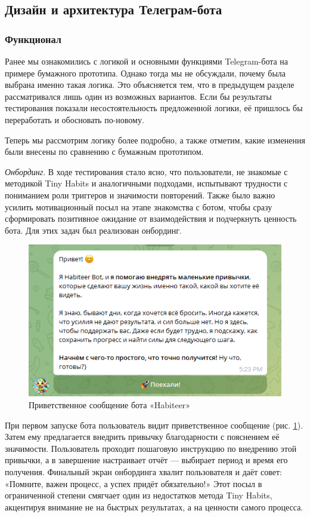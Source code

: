 \documentclass[pdflatex,sn-mathphys-num]{sn-jnl}%
\theoremstyle{thmstyleone}%
\theoremstyle{thmstyletwo}%
\theoremstyle{thmstylethree}%
\begin{document}
\subsection{Дизайн и архитектура Телеграм-бота}

\subsubsection{Функционал}

Ранее мы ознакомились с логикой и основными функциями Telegram-бота на примере бумажного прототипа. Однако тогда мы не обсуждали, почему была выбрана именно такая логика. Это объясняется тем, что в предыдущем разделе рассматривался лишь один из возможных вариантов. Если бы результаты тестирования показали несостоятельность предложенной логики, её пришлось бы переработать и обосновать по-новому.

Теперь мы рассмотрим логику более подробно, а также отметим, какие изменения были внесены по сравнению с бумажным прототипом.

\textit{Онбординг}. В ходе тестирования стало ясно, что пользователи, не знакомые с методикой Tiny Habits и аналогичными подходами, испытывают трудности с пониманием роли триггеров и значимости повторений. Также было важно усилить мотивационный посыл на этапе знакомства с ботом, чтобы сразу сформировать позитивное ожидание от взаимодействия и подчеркнуть ценность бота. Для этих задач был реализован онбординг.

\begin{figure}
    \centering
    \includegraphics[width=0.6\linewidth]{figures/bot_first_message.png}
    \caption{Приветственное сообщение бота «Habiteer»}
    \label{fig:bot_first_message}
\end{figure}

При первом запуске бота пользователь видит приветственное сообщение (рис. \ref{fig:bot_first_message}). Затем ему предлагается внедрить привычку благодарности с пояснением её значимости. Пользователь проходит пошаговую инструкцию по внедрению этой привычки, а в завершение настраивает отчёт — выбирает период и время его получения. Финальный экран онбординга хвалит пользователя и даёт совет: «Помните, важен процесс, а успех придёт обязательно!» Этот посыл в ограниченной степени смягчает один из недостатков метода Tiny Habits, акцентируя внимание не на быстрых результатах, а на ценности самого процесса.
\end{document}
